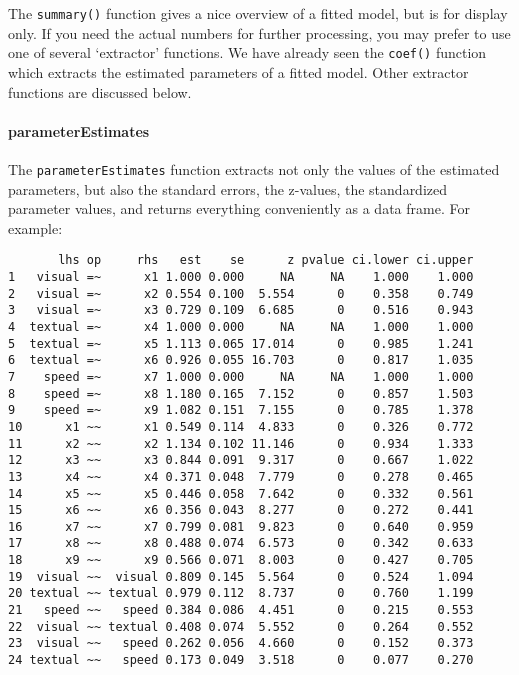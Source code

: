 The \texttt{summary()} function gives a nice overview of a fitted model,
but is for display only. If you need the actual numbers for further
processing, you may prefer to use one of several `extractor' functions.
We have already seen the \texttt{coef()} function which extracts the
estimated parameters of a fitted model. Other extractor functions are
discussed below.

\hypertarget{parameterestimates}{%
\paragraph{parameterEstimates}\label{parameterestimates}}

The \texttt{parameterEstimates} function extracts not only the values of
the estimated parameters, but also the standard errors, the z-values,
the standardized parameter values, and returns everything conveniently
as a data frame. For example:

\begin{Shaded}
\begin{Highlighting}[]
\StringTok{ }
\end{Highlighting}
\end{Shaded}

\begin{verbatim}
       lhs op     rhs   est    se      z pvalue ci.lower ci.upper
1   visual =~      x1 1.000 0.000     NA     NA    1.000    1.000
2   visual =~      x2 0.554 0.100  5.554      0    0.358    0.749
3   visual =~      x3 0.729 0.109  6.685      0    0.516    0.943
4  textual =~      x4 1.000 0.000     NA     NA    1.000    1.000
5  textual =~      x5 1.113 0.065 17.014      0    0.985    1.241
6  textual =~      x6 0.926 0.055 16.703      0    0.817    1.035
7    speed =~      x7 1.000 0.000     NA     NA    1.000    1.000
8    speed =~      x8 1.180 0.165  7.152      0    0.857    1.503
9    speed =~      x9 1.082 0.151  7.155      0    0.785    1.378
10      x1 ~~      x1 0.549 0.114  4.833      0    0.326    0.772
11      x2 ~~      x2 1.134 0.102 11.146      0    0.934    1.333
12      x3 ~~      x3 0.844 0.091  9.317      0    0.667    1.022
13      x4 ~~      x4 0.371 0.048  7.779      0    0.278    0.465
14      x5 ~~      x5 0.446 0.058  7.642      0    0.332    0.561
15      x6 ~~      x6 0.356 0.043  8.277      0    0.272    0.441
16      x7 ~~      x7 0.799 0.081  9.823      0    0.640    0.959
17      x8 ~~      x8 0.488 0.074  6.573      0    0.342    0.633
18      x9 ~~      x9 0.566 0.071  8.003      0    0.427    0.705
19  visual ~~  visual 0.809 0.145  5.564      0    0.524    1.094
20 textual ~~ textual 0.979 0.112  8.737      0    0.760    1.199
21   speed ~~   speed 0.384 0.086  4.451      0    0.215    0.553
22  visual ~~ textual 0.408 0.074  5.552      0    0.264    0.552
23  visual ~~   speed 0.262 0.056  4.660      0    0.152    0.373
24 textual ~~   speed 0.173 0.049  3.518      0    0.077    0.270
\end{verbatim}

